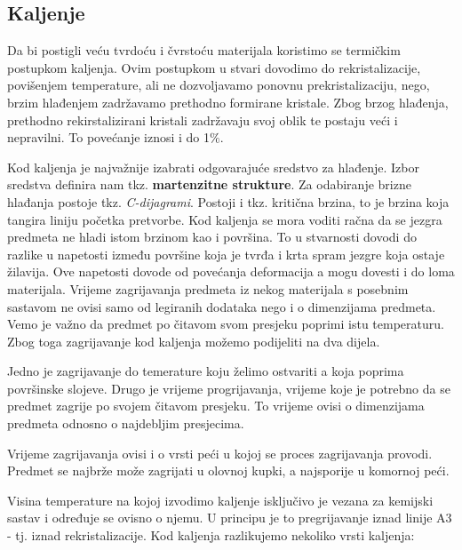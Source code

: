 \documentclass[a4paper,12pt]{article}
\numberwithin{figure}{section}
\begin{document}
\subsection{Kaljenje}
Da bi postigli veću tvrdoću i čvrstoću materijala koristimo se termičkim postupkom kaljenja. Ovim postupkom u stvari dovodimo do rekristalizacije, povišenjem temperature, ali ne dozvoljavamo ponovnu prekristalizaciju, nego, brzim hlađenjem zadržavamo prethodno formirane kristale. Zbog brzog hlađenja, prethodno rekirstalizirani kristali zadržavaju svoj oblik te postaju veći i nepravilni. To povećanje iznosi i do 1$\%$. \par
Kod kaljenja je najvažnije izabrati odgovarajuće sredstvo za hlađenje. Izbor sredstva definira nam tkz. \textbf{martenzitne strukture}. Za odabiranje brizne hlađanja postoje tkz. \textit{C-dijagrami}.
Postoji i tkz. kritična brzina, to je brzina koja tangira liniju početka pretvorbe. Kod kaljenja se mora voditi račna da se jezgra predmeta ne hladi istom brzinom kao i površina. To u stvarnosti dovodi do razlike u napetosti između površine koja je tvrđa i krta spram jezgre koja ostaje žilavija. Ove napetosti dovode od povećanja deformacija a mogu dovesti i do loma materijala. Vrijeme zagrijavanja predmeta iz nekog materijala s posebnim sastavom ne ovisi samo od legiranih dodataka nego i o dimenzijama predmeta. Vemo je važno da predmet po čitavom svom presjeku poprimi istu temperaturu. Zbog toga zagrijavanje kod kaljenja možemo podijeliti na dva dijela.\par
Jedno je zagrijavanje do temerature koju želimo ostvariti a koja poprima površinske slojeve. Drugo je vrijeme progrijavanja, vrijeme koje je potrebno da se predmet zagrije po svojem čitavom presjeku. To vrijeme ovisi o dimenzijama predmeta odnosno o najdebljim presjecima.\par 
Vrijeme zagrijavanja ovisi i o vrsti peći u kojoj se proces zagrijavanja provodi. Predmet se najbrže može zagrijati u olovnoj kupki, a najsporije u komornoj peći.\par
Visina temperature na kojoj izvodimo kaljenje isključivo je vezana za kemijski sastav i određuje se ovisno o njemu. U principu je to pregrijavanje iznad linije A3 - tj. iznad rekristalizacije. Kod kaljenja razlikujemo nekoliko vrsti kaljenja:
\end{document}
